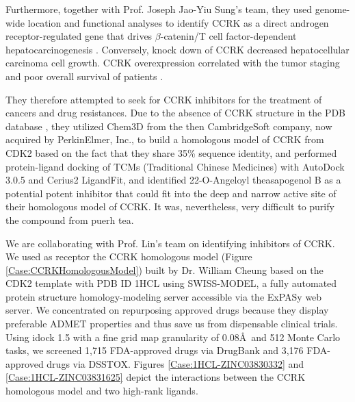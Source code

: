 Furthermore, together with Prof. Joseph Jao-Yiu Sung's team, they used genome-wide location and functional analyses to identify CCRK as a direct androgen receptor-regulated gene that drives $\beta$-catenin/T cell factor-dependent hepatocarcinogenesis \citep{1146}. Conversely, knock down of CCRK decreased hepatocellular carcinoma cell growth. CCRK overexpression correlated with the tumor staging and poor overall survival of patients \citep{1146}.

They therefore attempted to seek for CCRK inhibitors for the treatment of cancers and drug resistances. Due to the absence of CCRK structure in the PDB database \citep{540,537}, they utilized Chem3D from the then CambridgeSoft company, now acquired by PerkinElmer, Inc., to build a homologous model of CCRK from CDK2 based on the fact that they share 35\% sequence identity, and performed protein-ligand docking of TCMs (Traditional Chinese Medicines) with AutoDock 3.0.5 and Cerius2 LigandFit, and identified 22-O-Angeloyl theasapogenol B as a potential potent inhibitor that could fit into the deep and narrow active site of their homologous model of CCRK. It was, nevertheless, very difficult to purify the compound from puerh tea.

We are collaborating with Prof. Lin's team on identifying inhibitors of CCRK. We used as receptor the CCRK homologous model (Figure \ref{Case:CCRKHomologousModel}) built by Dr. William Cheung based on the CDK2 template with PDB ID 1HCL \citep{1142} using SWISS-MODEL, a fully automated protein structure homology-modeling server accessible via the ExPASy web server. We concentrated on repurposing approved drugs because they display preferable ADMET properties and thus save us from dispensable clinical trials. Using idock 1.5 with a fine grid map granularity of 0.08\AA\ and 512 Monte Carlo tasks, we screened 1,715 FDA-approved drugs via DrugBank and 3,176 FDA-approved drugs via DSSTOX. Figures \ref{Case:1HCL-ZINC03830332} and \ref{Case:1HCL-ZINC03831625} depict the interactions between the CCRK homologous model and two high-rank ligands.


